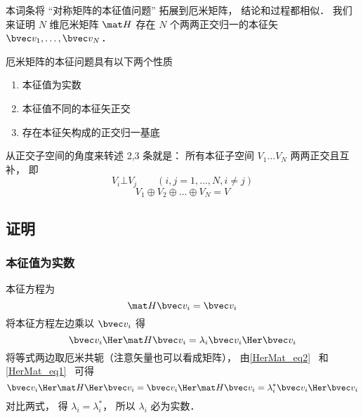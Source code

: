 
\begin{issues}
\issueDraft
\end{issues}


本词条将 “对称矩阵的本征值问题” 拓展到厄米矩阵， 结论和过程都相似． 我们来证明 $N$ 维厄米矩阵 $\mat H$ 存在 $N$ 个两两正交归一的本征矢 $\bvec v_1, \dots, \bvec v_N$．


\begin{theorem}{}
厄米矩阵的本征问题具有以下两个性质
\begin{enumerate}
\item 本征值为实数
\item 本征值不同的本征矢正交
\item 存在本征矢构成的正交归一基底
\end{enumerate}
\end{theorem}

从正交子空间的角度来转述 2,3 条就是： 所有本征子空间 $V_1 \dots V_N$ 两两正交且互补， 即
\begin{equation}
V_i\bot V_j \qquad (i, j = 1,\dots, N, i \ne j)
\end{equation}
\begin{equation}
V_1\oplus V_2 \oplus\dots \oplus V_N = V
\end{equation}


\subsection{证明}
\subsubsection{本征值为实数}
本征方程为
\begin{equation}
\mat H \bvec v_i = \bvec v_i
\end{equation}
将本征方程左边乘以 $\bvec v_i$ 得
\begin{equation}
\bvec v_i\Her \mat H \bvec v_i = \lambda_i \bvec v_i\Her \bvec v_i
\end{equation}
将等式两边取厄米共轭（注意矢量也可以看成矩阵）， 由\autoref{HerMat_eq2}~ 和\autoref{HerMat_eq1}~ 可得
\begin{equation}
\bvec v_i\Her \mat H\Her \bvec v_i = \bvec v_i\Her \mat H \bvec v_i = \lambda_i^* \bvec v_i\Her \bvec v_i
\end{equation}
对比两式， 得 $\lambda_i = \lambda_i^*$， 所以 $\lambda_i$ 必为实数．

